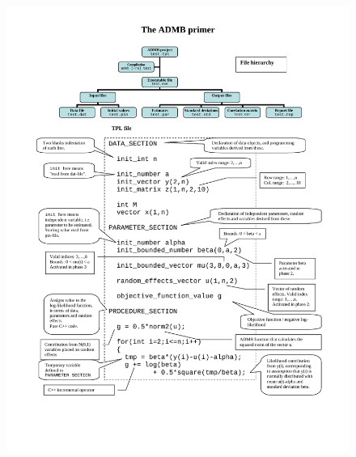 \documentclass[12pt,letter,reqno]{book}
\begin{document}
\section{}
\vskip0cm
\begin{figure}[H]
\includegraphics[width=17cm]{ADMBprim.pdf}
\label{fig:primer}
\end{figure}




%


\printindex
\end{document}
